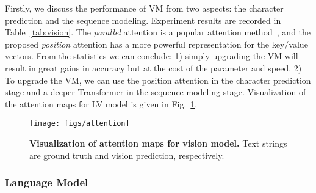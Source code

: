 \documentclass[10pt,journal,compsoc]{IEEEtran}
\begin{document}
Firstly, we discuss the performance of VM from two aspects: the character prediction and the sequence modeling. Experiment results are recorded in Table~\ref{tab:vision}. The \emph{parallel} attention is a popular attention method~\cite{lyu20192d,yu2020towards}, and the proposed \emph{position} attention has a more powerful representation for the key/value vectors. From the statistics we can conclude: 1) simply upgrading the VM will result in great gains in accuracy but at the cost of the parameter and speed. 2) To upgrade the VM, we can use the position attention in the character prediction stage and a deeper Transformer in the sequence modeling stage. Visualization of the attention maps for LV model is given in Fig.~\ref{fig:attention_map}.

\begin{figure}
   \begin{center}
      \texttt{[image: figs/attention]}
      \caption{\textbf{Visualization of attention maps for vision model.} Text strings are ground truth and vision prediction, respectively.}
      \label{fig:attention_map}
   \end{center}
   \vspace{-0.5em}   
\end{figure}


\subsubsection{Language Model}
\end{document}
